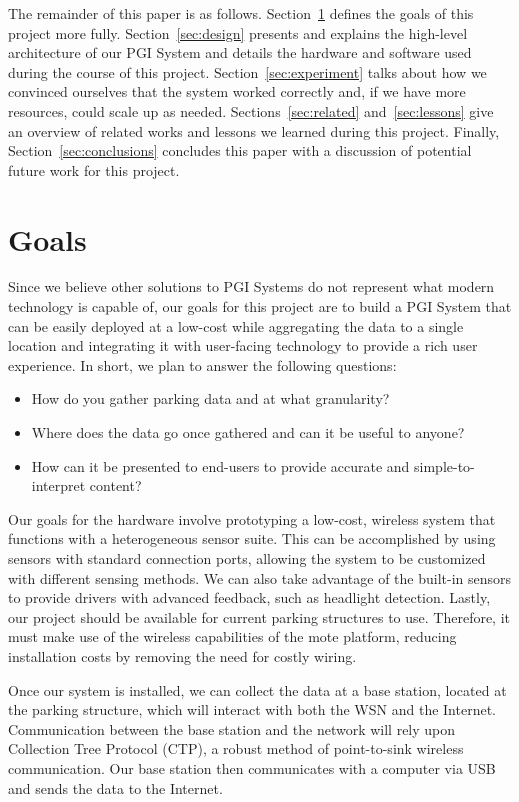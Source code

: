 \documentclass{acm_proc}
\begin{document}
The remainder of this paper is as follows.
Section~\ref{sec:goals} defines the goals of this project more fully.
Section~\ref{sec:design} presents and explains the high-level architecture
of our PGI System and details the hardware and software used during the
course of this project.
Section~\ref{sec:experiment} talks about how we convinced ourselves that
the system worked correctly and, if we have more resources, could scale up
as needed.
Sections~\ref{sec:related} and~\ref{sec:lessons} give an overview of
related works and lessons we learned during this project.
Finally, Section~\ref{sec:conclusions} concludes this paper with a
discussion of potential future work for this project.

\section{Goals}\label{sec:goals}

Since we believe other solutions to PGI Systems do not represent what
modern technology is capable of, our goals for this project are to build a
PGI System that can be easily deployed at a low-cost while aggregating the
data to a single location and integrating it with user-facing technology to
provide a rich user experience.
In short, we plan to answer the following questions:
\begin{itemize}
	\item How do you gather parking data and at what granularity?
	\item Where does the data go once gathered and can it be useful to
	anyone?
	\item How can it be presented to end-users to provide accurate and
	simple-to-interpret content?
\end{itemize}

Our goals for the hardware involve prototyping a low-cost, wireless system
that functions with a heterogeneous sensor suite.
This can be accomplished by using sensors with standard connection ports,
allowing the system to be customized with different sensing methods.
We can also take advantage of the built-in sensors to provide drivers
with advanced feedback, such as headlight detection.
Lastly, our project should be available for current parking structures to
use.
Therefore, it must make use of the wireless capabilities of the mote
platform, reducing installation costs by removing the need for costly
wiring.

Once our system is installed, we can collect the data at a base station,
located at the parking structure, which will interact with both the WSN and
the Internet.
Communication between the base station and the network will rely upon
Collection Tree Protocol (CTP), a robust method of point-to-sink wireless
communication.
Our base station then communicates with a computer via USB and sends
the data to the Internet.
\end{document}
